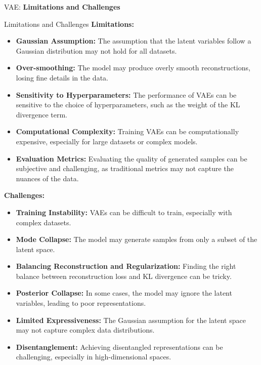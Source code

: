 \begin{frame}{}
	\LARGE VAE: \textbf{Limitations and Challenges}
\end{frame}

\begin{frame}[allowframebreaks]{Limitations and Challenges}
\textbf{Limitations:}
\begin{itemize}
    \item \textbf{Gaussian Assumption:} The assumption that the latent variables follow a Gaussian distribution may not hold for all datasets.
    \item \textbf{Over-smoothing:} The model may produce overly smooth reconstructions, losing fine details in the data.
    \item \textbf{Sensitivity to Hyperparameters:} The performance of VAEs can be sensitive to the choice of hyperparameters, such as the weight of the KL divergence term.
    \item \textbf{Computational Complexity:} Training VAEs can be computationally expensive, especially for large datasets or complex models.
    \item \textbf{Evaluation Metrics:} Evaluating the quality of generated samples can be subjective and challenging, as traditional metrics may not capture the nuances of the data.
\end{itemize}
\framebreak

\textbf{Challenges:}
\begin{itemize}
    \item \textbf{Training Instability:} VAEs can be difficult to train, especially with complex datasets.
    \item \textbf{Mode Collapse:} The model may generate samples from only a subset of the latent space.
    \item \textbf{Balancing Reconstruction and Regularization:} Finding the right balance between reconstruction loss and KL divergence can be tricky.
    \item \textbf{Posterior Collapse:} In some cases, the model may ignore the latent variables, leading to poor representations.
    \item \textbf{Limited Expressiveness:} The Gaussian assumption for the latent space may not capture complex data distributions.
    \item \textbf{Disentanglement:} Achieving disentangled representations can be challenging, especially in high-dimensional spaces.
\end{itemize}
\framebreak


\end{frame}
